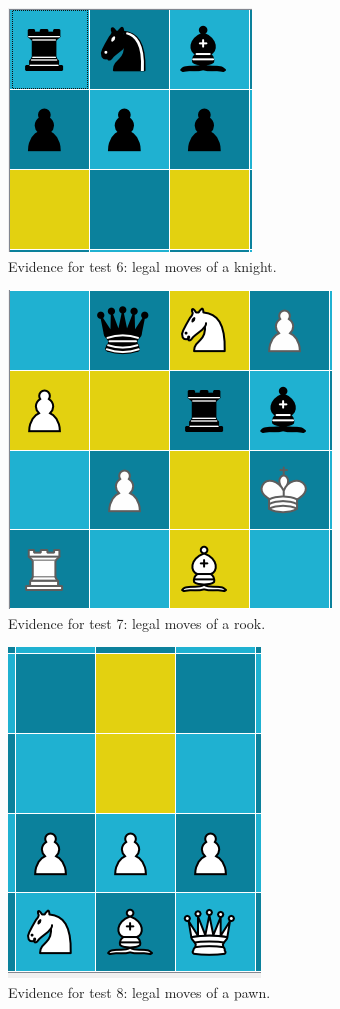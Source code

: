 \begin{figure}
	\centering
	\includegraphics{images/screenshots/test-6}
	\caption{Evidence for test 6: legal moves of a knight.}
	\label{test-6}
\end{figure}
\begin{figure}
	\centering
	\includegraphics{images/screenshots/test-7}
	\caption{Evidence for test 7: legal moves of a rook.}
	\label{test-7}
\end{figure}
\begin{figure}
	\centering
	\includegraphics{images/screenshots/test-8}
	\caption{Evidence for test 8: legal moves of a pawn.}
	\label{test-8}
\end{figure}
